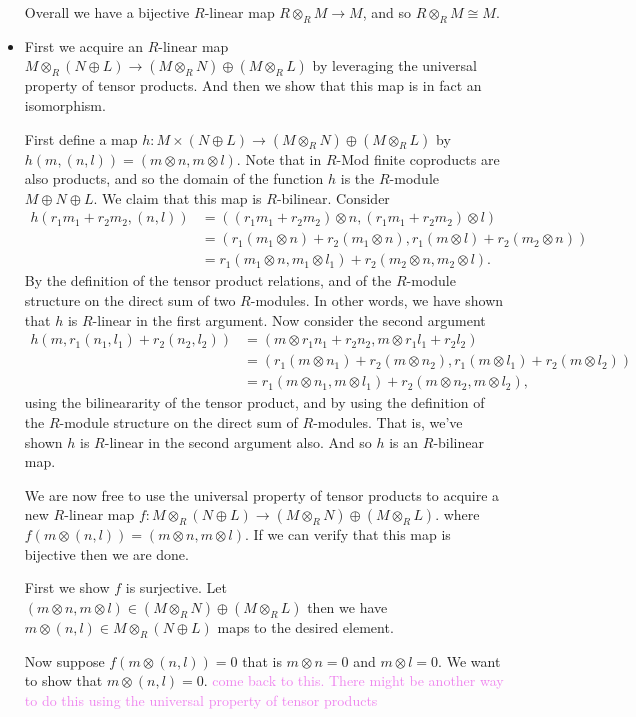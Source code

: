 \documentclass[12pt,letterpaper,boxed]{hmcpset}
\newcommand{\wg}[1]{\textcolor{violet}{#1}}
\begin{document}
\begin{solution}
\begin{itemize}
Overall we have a bijective $R$-linear map $R \otimes_R M \to M$, and
so $R \otimes_R M \cong M$.

\item 
First we acquire an $R$-linear map $M \otimes_R (N \oplus L) \to (M
\otimes_R N) \oplus (M \otimes_R L)$ by leveraging the universal
property of tensor products. And then we show that this map is in fact
an isomorphism.

First define a map $h: M \times (N \oplus L) \to (M \otimes_R N)
\oplus (M \otimes_R L)$ by $h(m, (n,l)) = (m \otimes n, m \otimes l)$. 
Note that in $R$-Mod finite coproducts are also products, and so the
domain of the function $h$ is the $R$-module $M \oplus N \oplus L$.
We claim that this map is $R$-bilinear. 
Consider
\begin{align*}
	h(r_1 m_1 + r_2 m_2, (n,l)) 
		&= ((r_1m_1 + r_2m_2) \otimes n , (r_1m_1 + r_2 m_2) \otimes l) \\
		&= (r_1(m_1 \otimes n) + r_2 (m_1 \otimes n), r_1(m \otimes l) + r_2(m_2 \otimes n)) \\
		&= r_1(m_1 \otimes n, m_1 \otimes l_1) + r_2(m_2 \otimes n, m_2 \otimes l).
\end{align*}
By the definition of the tensor product relations, and of the
$R$-module structure on the direct sum of two $R$-modules. In other
words, we have shown that $h$ is $R$-linear in the first argument. Now
consider the second argument
\begin{align*}
	h(m, r_1(n_1, l_1) + r_2(n_2, l_2)) 
		&= (m \otimes r_1 n_1 + r_2 n_2, m \otimes r_1 l_1 + r_2 l_2) \\ 
		&= (r_1 (m\otimes n_1) + r_2 (m \otimes n_2), r_1(m \otimes l_1) + r_2(m \otimes l_2)) \\
		&= r_1(m \otimes n_1, m \otimes l_1) + r_2(m \otimes n_2, m \otimes l_2), 
\end{align*}
using the bilineararity of the tensor product, and by using the
definition of the $R$-module structure on the direct sum of
$R$-modules. That is, we've shown $h$ is $R$-linear in the second
argument also. And so $h$ is an $R$-bilinear map.

We are now free to use the universal property of tensor products to
acquire a new $R$-linear map $f: M \otimes_R (N \oplus L) \to (M
\otimes_R N) \oplus (M \otimes_R L)$. where $f(m \otimes (n,l)) = (m \otimes
n, m \otimes l)$. If we can verify that this map is bijective then we
are done. 

First we show $f$ is surjective. Let $(m \otimes n, m \otimes l) \in
(M \otimes_R N) \oplus (M \otimes_R L)$ then we have $m \otimes (n,l)
\in M \otimes_R (N \oplus L)$ maps to the desired element.

Now suppose $f(m \otimes (n,l)) = 0$ that is $m \otimes n = 0$ and $m
\otimes l = 0$. We want to show that $m \otimes (n,l) = 0$.
\wg{come back to this. There might be another way to do this using the
universal property of tensor products}





\end{itemize}
\end{solution}
\end{document}
